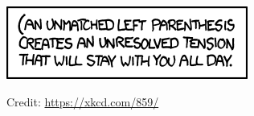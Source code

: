 \documentclass[a4paper]{article}
\begin{document}

\begin{onlysolution}
  \begin{center}
    \includegraphics[scale=1.0]{xkcd_leftpar}

    \scriptsize Credit: \href{https://xkcd.com/859/}{https://xkcd.com/859/}
  \end{center}
\end{onlysolution}







\end{document}
